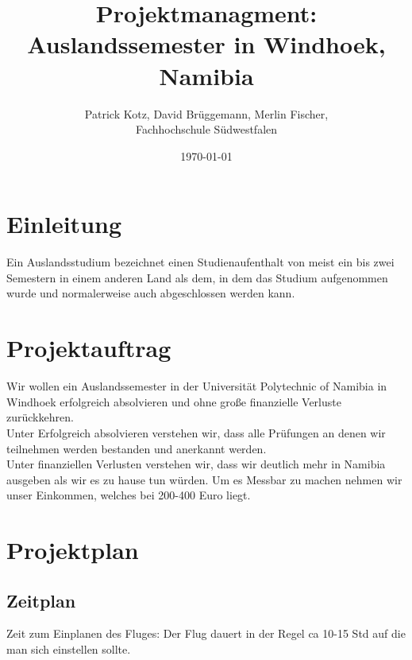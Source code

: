 \documentclass[11pt]{article}
\begin{document}
\begin{titlepage}


\begin{center}
  \title{Projektmanagment: \\Auslandssemester in Windhoek, Namibia}
  \author{Patrick Kotz, David Brüggemann, Merlin Fischer,\\ Fachhochschule Südwestfalen}
  \date{\today}
\end{center}
\end{titlepage}

\clearpage
\vspace*{\fill}
\maketitle
\vspace*{\fill}
\clearpage

\newpage
\tableofcontents
\newpage

\section{Einleitung}
Ein Auslandsstudium bezeichnet einen Studienaufenthalt von meist ein bis zwei Semestern in einem anderen Land als dem, in dem das Studium aufgenommen wurde und normalerweise auch abgeschlossen werden kann.

\section{Projektauftrag}
Wir wollen ein Auslandssemester in der Universität Polytechnic of Namibia in Windhoek erfolgreich absolvieren und ohne große finanzielle Verluste zurückkehren.\\

Unter Erfolgreich absolvieren verstehen wir, dass alle Prüfungen an denen wir teilnehmen werden bestanden und anerkannt werden.\\

Unter finanziellen Verlusten verstehen wir, dass wir deutlich mehr in Namibia ausgeben als wir es zu hause tun würden. Um es Messbar zu machen nehmen wir unser Einkommen, welches bei 200-400 Euro liegt.


\section{Projektplan}

\subsection{Zeitplan}
Zeit zum Einplanen des Fluges: Der Flug dauert in der Regel ca 10-15 Std auf die man sich einstellen sollte.
\end{document}
